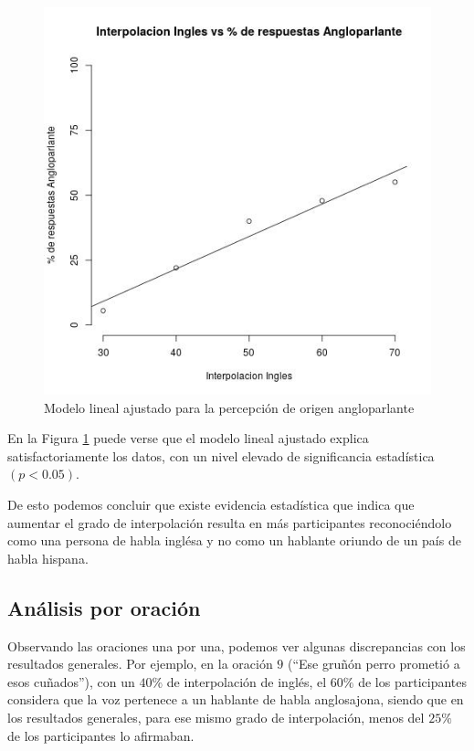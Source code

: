 \begin{figure}
\begin{center}
\includegraphics[trim={0 0 0 1.5cm},clip,width=.5\textwidth]{imagenes/estadistica/english.jpg}
\end{center}
\caption{Modelo lineal ajustado para la percepción de origen angloparlante}
\label{stadisticEnglish}
\end{figure}

En la Figura \ref{stadisticEnglish} puede verse que el modelo lineal ajustado explica satisfactoriamente los datos, con un nivel elevado de significancia estadística $(p<0.05)$.

De esto podemos concluir que existe evidencia estadística que indica que aumentar el grado de interpolación resulta en más participantes reconociéndolo como una persona de habla inglésa y no como un hablante oriundo de un país de habla hispana.

\subsection{Análisis por oración}

Observando las oraciones una por una, podemos ver algunas discrepancias con los resultados generales. Por ejemplo, en la oración $9$ (``Ese gruñón perro prometió a esos cuñados''), con un $40\%$ de interpolación de inglés, el $60\%$ de los participantes considera que la voz pertenece a un hablante de habla anglosajona, siendo que en los resultados generales, para ese mismo grado de interpolación, menos del $25\%$ de los participantes lo afirmaban.

